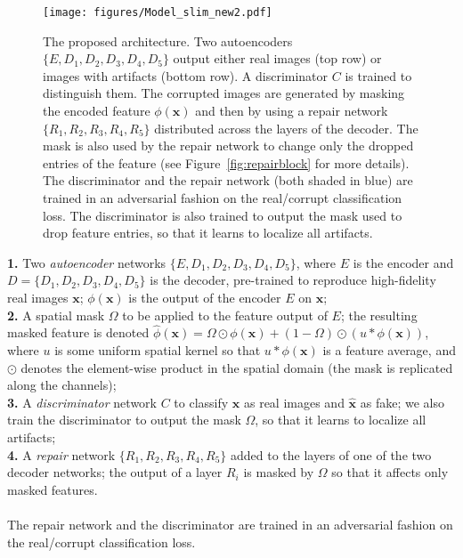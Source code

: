 \documentclass[10pt,twocolumn,letterpaper]{article}
\begin{document}
\begin{figure*}[t]
\begin{center}
  \texttt{[image: figures/Model\_slim\_new2.pdf]}
\end{center}
   \caption{The proposed architecture. Two autoencoders $\{E,D_1,D_2,D_3,D_4,D_5\}$ output either real images (top row) or images with artifacts (bottom row). A discriminator $C$ is trained to distinguish them. The corrupted images are generated by masking the encoded feature $\phi(\mathbf{x})$ and then by using a repair network $\{R_1,R_2,R_3,R_4,R_5\}$ distributed across the layers of the decoder. The mask is also used by the repair network to change only the dropped entries of the feature (see Figure~\ref{fig:repairblock} for more details). The discriminator and the repair network (both shaded in blue) are trained in an adversarial fashion on the real/corrupt classification loss. The discriminator is also trained to output the mask used to drop feature entries, so that it learns to localize all artifacts.}
\label{fig:architecture}
\end{figure*}

\noindent\textbf{1.} Two \emph{autoencoder} networks $\{E,D_1,D_2,D_3,D_4,D_5\}$, where $E$ is the encoder and $D = \{D_1,D_2,D_3,D_4,D_5\}$ is the decoder, pre-trained to reproduce high-fidelity real images $\mathbf{x}$; $\phi(\mathbf{x})$ is the output of the encoder $E$ on $\mathbf{x}$;\\
\noindent\textbf{2.} A spatial mask $\Omega$ to be applied to the feature output of $E$; the resulting masked feature is denoted $\hat \phi(\mathbf{x}) = \Omega \odot \phi(\mathbf{x}) + (1-\Omega) \odot (u \ast  \phi(\mathbf{x}))$, where $u$ is some uniform spatial kernel so that $u \ast  \phi(\mathbf{x})$ is a feature average, and $\odot$ denotes the element-wise product in the spatial domain (the mask is replicated along the channels);\\ 
\noindent\textbf{3.} A \emph{discriminator} network $C$ to classify $\mathbf{x}$ as real images and $\hat{\mathbf{x}}$ as fake; we also train the discriminator to output the mask $\Omega$, so that it learns to localize all artifacts;\\
\noindent\textbf{4.} A \emph{repair} network $\{R_1,R_2,R_3,R_4,R_5\}$ added to the layers of one of the two decoder networks; the output of a layer $R_i$ is masked by $\Omega$ so that it affects only masked features.\\~\\
The repair network and the discriminator are trained in an adversarial fashion on the  real/corrupt classification loss.
\end{document}
